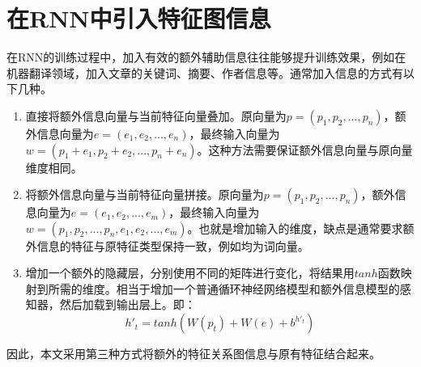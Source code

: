 \section{在RNN中引入特征图信息}
在RNN的训练过程中，加入有效的额外辅助信息往往能够提升训练效果，例如在机器翻译领域，加入文章的关键词、摘要、作者信息等。通常加入信息的方式有以下几种。

\begin{enumerate}
  \item 直接将额外信息向量与当前特征向量叠加。原向量为$p=(p_1,p_2,...,p_n)$，额外信息向量为$e=(e_1,e_2,...,e_n)$，最终输入向量为$w=(p_1+e_1,p_2+e_2,...,p_n+e_n)$。这种方法需要保证额外信息向量与原向量维度相同。
  \item 将额外信息向量与当前特征向量拼接。原向量为$p=(p_1,p_2,...,p_n)$，额外信息向量为$e=(e_1,e_2,...,e_m)$，最终输入向量为$w=(p_1,p_2,...,p_n,e_1,e_2,...,e_m)$。也就是增加输入的维度，缺点是通常要求额外信息的特征与原特征类型保持一致，例如均为词向量。
  \item 增加一个额外的隐藏层，分别使用不同的矩阵进行变化，将结果用$tanh$函数映射到所需的维度。相当于增加一个普通循环神经网络模型和额外信息模型的感知器，然后加载到输出层上。即：
  \begin{equation}
    h'_t= tanh(W(p_t) + W(e) + b^{h'_t})
  \end{equation}
\end{enumerate}
因此，本文采用第三种方式将额外的特征关系图信息与原有特征结合起来。

